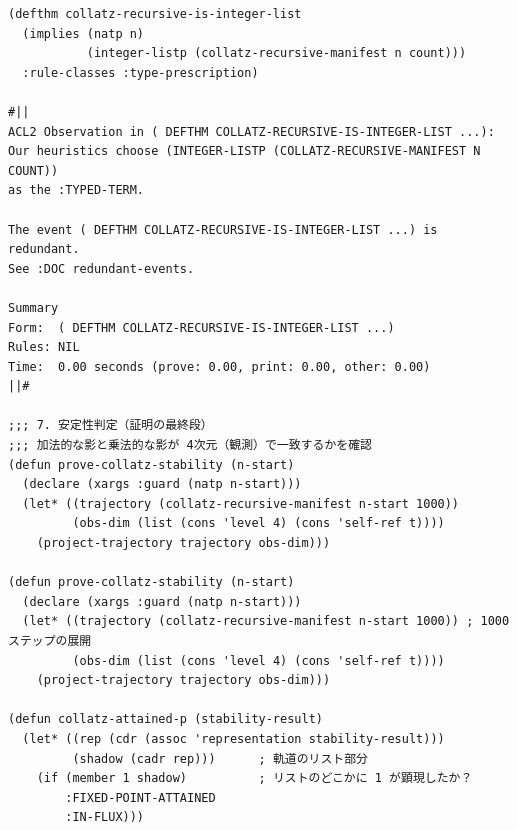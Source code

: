 \documentclass[11pt,a4paper]{article}
\theoremstyle{definition}
\begin{document}
\begin{lstlisting}[caption={停止性の外部依存：二次元限界の形式的記録}]
(defthm collatz-recursive-is-integer-list
  (implies (natp n)
           (integer-listp (collatz-recursive-manifest n count)))
  :rule-classes :type-prescription)

#||
ACL2 Observation in ( DEFTHM COLLATZ-RECURSIVE-IS-INTEGER-LIST ...):
Our heuristics choose (INTEGER-LISTP (COLLATZ-RECURSIVE-MANIFEST N COUNT))
as the :TYPED-TERM.

The event ( DEFTHM COLLATZ-RECURSIVE-IS-INTEGER-LIST ...) is redundant.
See :DOC redundant-events.

Summary
Form:  ( DEFTHM COLLATZ-RECURSIVE-IS-INTEGER-LIST ...)
Rules: NIL
Time:  0.00 seconds (prove: 0.00, print: 0.00, other: 0.00)
||#

;;; 7. 安定性判定（証明の最終段）
;;; 加法的な影と乗法的な影が 4次元（観測）で一致するかを確認
(defun prove-collatz-stability (n-start)
  (declare (xargs :guard (natp n-start)))
  (let* ((trajectory (collatz-recursive-manifest n-start 1000))
         (obs-dim (list (cons 'level 4) (cons 'self-ref t))))
    (project-trajectory trajectory obs-dim)))

(defun prove-collatz-stability (n-start)
  (declare (xargs :guard (natp n-start)))
  (let* ((trajectory (collatz-recursive-manifest n-start 1000)) ; 1000ステップの展開
         (obs-dim (list (cons 'level 4) (cons 'self-ref t))))
    (project-trajectory trajectory obs-dim)))

(defun collatz-attained-p (stability-result)
  (let* ((rep (cdr (assoc 'representation stability-result)))
         (shadow (cadr rep)))      ; 軌道のリスト部分
    (if (member 1 shadow)          ; リストのどこかに 1 が顕現したか？
        :FIXED-POINT-ATTAINED
        :IN-FLUX)))
\end{lstlisting}
\end{document}
